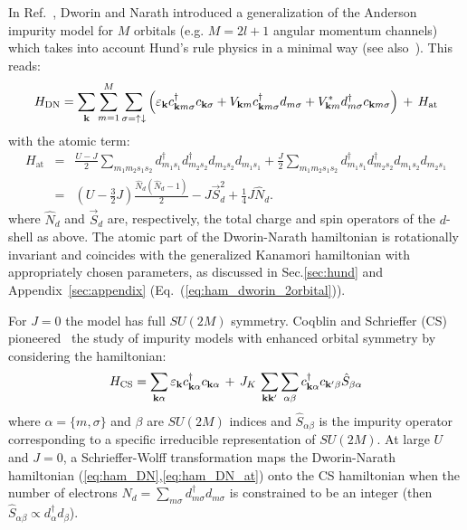 \documentclass[]{ar2e-changed}%
\def\ek{\varepsilon_{\bf k}}
\def\hN{\hat{N}}
\def\spinup{\uparrow}
\def\spindown{\downarrow}
\def\vk{{\bf k}}
\begin{document}
In Ref.~\cite{dworin_prl_1970}, Dworin and Narath introduced a generalization of the Anderson 
impurity model for $M$ orbitals (e.g.  $M=2l+1$ angular momentum channels) which takes into account 
Hund's rule physics in a minimal way (see also~\cite{anderson_physrev_1961,caroli_hund_prl_1969}). This reads: 
%
\begin{equation}
H_{\mathrm{DN}}= \sum_{\vk}\sum_{m=1}^M\sum_{\sigma=\spinup\spindown}
\left(\ek c^{\dagger}_{\vk m \sigma}c_{\vk\sigma} +  V_{\vk m} c^\dagger_{\vk m\sigma} d_{m \sigma} + 
V_{\vk m}^* d^\dagger_{m\sigma}c_{\vk m\sigma}\right) \,+\, 
H_{\rm{at}}
\label{eq:ham_DN}
\end{equation}
with the atomic term: 
\begin{eqnarray}
 H_{\mathrm{at}}
 &=&\frac{U-J}{2}\sum_{m_1 m_2 s_1 s_2}d^\dagger_{m_1
    s_1} d^\dagger_{m_2 s_2} d_{m_2 s_2} d_{m_1 s_1} + 
\frac{J}{2}  \sum_{m_1 m_2 s_1 s_2} d^\dagger_{m_1 s_1} d^\dagger_{m_2 s_2}d_{m_1 s_2} d_{m_2 s_1} \nonumber \\ 
  &=&  (U-\frac{3}{2}J)\frac {\hN_d(\hN_d-1)}{2}-J \vec{S}_d^2 +\frac{1}{4}J \hN_d 
  \label{eq:ham_DN_at}.
\end{eqnarray}
where $\hat{N}_d$ and $\vec{S}_d$ are, respectively, the total charge and spin operators of the $d$-shell as above.  
%
The atomic part of the Dworin-Narath hamiltonian is rotationally invariant and 
coincides with the generalized Kanamori hamiltonian with appropriately chosen parameters, 
as discussed in Sec.\ref{sec:hund} and Appendix~\ref{sec:appendix} (Eq.~(\ref{eq:ham_dworin_2orbital})). 

For $J=0$ the model has full $SU(2M)$ symmetry. Coqblin and Schrieffer (CS) pioneered~\cite{coqblin_schrieffer_1969} the study of impurity 
models with enhanced orbital symmetry by considering the hamiltonian:
\begin{equation}
H_{\mathrm{CS}} = \sum_{\vk\alpha} \ek
c^\dagger_{\vk\alpha}c_{\vk\alpha}\,+\, 
J_K\,\sum_{\vk\vk^\prime}\sum_{\alpha\beta}
c^\dagger_{\vk\alpha}c_{\vk^\prime\beta} \hat{S}_{\beta\alpha}
\label{eq:ham_coqblin}
\end{equation}
%
%
where $\alpha=\{m,\sigma\}$ and $\beta$ are $SU(2M)$ indices and $\hat{S}_{\alpha\beta}$ is the impurity operator corresponding to 
a specific irreducible representation of $SU(2M)$.  At large $U$ and $J=0$, a Schrieffer-Wolff transformation maps the 
Dworin-Narath hamiltonian (\ref{eq:ham_DN},\ref{eq:ham_DN_at}) onto the CS hamiltonian when the number of electrons 
$N_d=\sum_{m\sigma}d^\dagger_{m\sigma}d_{m\sigma}$ is constrained to be an integer 
(then $\hat{S}_{\alpha\beta} \propto d^\dagger_\alpha d_\beta$). 
\end{document}
